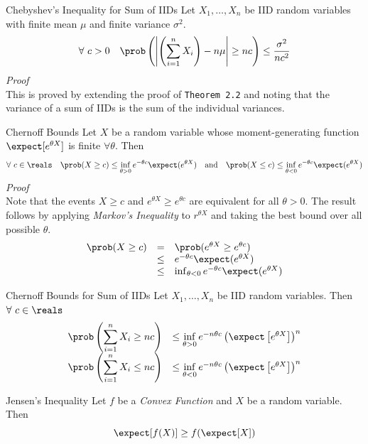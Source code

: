 \documentclass[11pt,a4paper]{article}
\begin{document}
  \begin{theorem}{Chebyshev's Inequality for Sum of IIDs}
    Let $X_1,\dots,X_n$ be IID random variables with finite mean $\mu$ and finite variance $\sigma^2$.
    \[ \forall\ c>0\quad\prob\left(\left|\left(\sum_{i=1}^nX_i\right)-n\mu\right|\geq nc\right)\leq\frac{\sigma^2}{nc^2} \]
    \textit{Proof}\\
    This is proved by extending the proof of \texttt{Theorem 2.2} and noting that the variance of a sum of IIDs is the sum of the individual variances.
  \end{theorem}

  \begin{theorem}{Chernoff Bounds}
    Let $X$ be a random variable whose moment-generating function $\expect[e^{\theta X}]$ is finite $\forall\theta$. Then
    \[ \forall\ c\in\reals\quad\prob(X\geq c)\leq\inf_{\theta>0}e^{-\theta c}\expect(e^{\theta X})\quad\text{and}\quad\prob(X\leq c)\leq\inf_{\theta<0}e^{-\theta c}\expect(e^{\theta X}) \]
    \textit{Proof}\\
    Note that the events $X\geq c$ and $e^{\theta X}\geq e^{\theta c}$ are equivalent for all $\theta>0$. The result follows by applying \textit{Markov's Inequality} to $r^{\theta X}$ and taking the best bound over all possible $\theta$.
    \[\begin{array}{rcl}
      \prob(X\geq c)&=&\prob(e^{\theta X}\geq e^{\theta c})\\
      &\leq&e^{-\theta c}\expect(e^{\theta X})\\
      &\leq&\inf_{\theta<0}e^{-\theta c}\expect(e^{\theta X}) %
    \end{array}\]
  \end{theorem}

  \begin{theorem}{Chernoff Bounds for Sum of IIDs}
    Let $X_1,\dots,X_n$ be IID random variables. Then $\forall\ c\in\reals$
    \[\begin{array}{rcl}
      {\displaystyle\prob\left(\sum_{i=1}^nX_i\geq nc\right)}&\leq\inf\limits_{\theta>0}e^{-n\theta c}\left(\expect\left[e^{\theta X}\right]\right)^n\\
      {\displaystyle\prob\left(\sum_{i=1}^nX_i\leq nc\right)}&\leq\inf\limits_{\theta<0}e^{-n\theta c}\left(\expect\left[e^{\theta X}\right]\right)^n
    \end{array}\]
  \end{theorem}

  \begin{theorem}{Jensen's Inequality}
    Let $f$ be a \textit{Convex Function} and $X$ be a random variable. Then
    \[ \expect[f(X)]\geq f(\expect[X]) \]
  \end{theorem}
\end{document}
